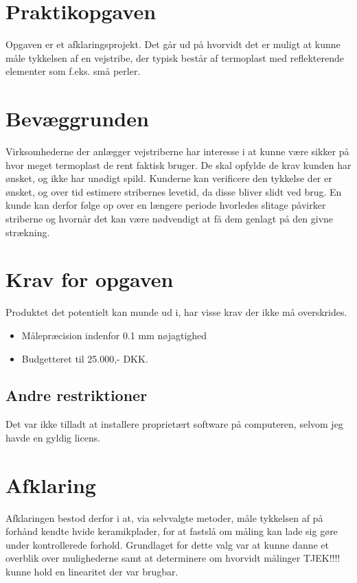\section{Praktikopgaven}
Opgaven er et afklaringsprojekt. Det går ud på hvorvidt det er muligt at kunne måle tykkelsen af en vejstribe, der typisk består af termoplast med reflekterende elementer som f.eks. små perler.

\section{Bevæggrunden}
Virksomhederne der anlægger vejstriberne har interesse i at kunne være sikker på hvor meget termoplast de rent faktisk bruger. De skal opfylde de krav kunden har ønsket, og ikke har unødigt spild. Kunderne kan verificere den tykkelse der er ønsket, og over tid estimere stribernes levetid, da disse bliver slidt ved brug. En kunde kan derfor følge op over en længere periode hvorledes slitage påvirker striberne og hvornår det kan være nødvendigt at få dem genlagt på den givne strækning.

\section{Krav for opgaven}
Produktet det potentielt kan munde ud i, har visse krav der ikke må overskrides.

\begin{itemize}
	\item Målepræcision indenfor 0.1 mm nøjagtighed
	\item Budgetteret til 25.000,- DKK.
\end{itemize}

\subsection{Andre restriktioner}
Det var ikke tilladt at installere proprietært software på computeren, selvom jeg havde en gyldig licens.

\section{Afklaring}
Afklaringen bestod derfor i at, via selvvalgte metoder, måle tykkelsen af på forhånd kendte hvide keramikplader, for at fastslå om måling kan lade sig gøre under kontrollerede forhold. Grundlaget for dette valg var at kunne danne et overblik over mulighederne samt at determinere om hvorvidt målinger TJEK!!!! kunne hold en linearitet der var brugbar.

